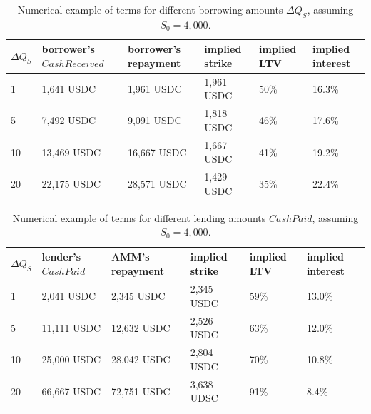 \documentclass[a4paper]{article}
\begin{document}
\begin{table}[]
\small
\begin{tabular}{p{0.5cm}p{2cm}p{2cm}p{2cm}p{2cm}p{1.5cm}}
\hline
\textbf{$\Delta Q_S$} & \textbf{borrower's $CashReceived$} & \textbf{borrower's repayment} & \textbf{implied strike} & \textbf{implied LTV} & \textbf{implied interest} \\ \hline
1                     & 1,641 USDC                  & 1,961 USDC                    & 1,961 USDC              & 50\%                 & 16.3\%                    \\ \hline
5                     & 7,492 USDC                   & 9,091 USDC                    & 1,818 USDC              & 46\%                 & 17.6\%                    \\ \hline
10                    & 13,469 USDC                  & 16,667 USDC                   & 1,667 USDC              & 41\%                 & 19.2\%                    \\ \hline
20                    & 22,175 USDC                  & 28,571 USDC                   & 1,429 USDC              & 35\%                 & 22.4\%                    \\ \hline
\end{tabular}
\label{tab:example_borrowers}
\caption{Numerical example of terms for different borrowing amounts $\Delta Q_S$, assuming $S_0=4,000$.}
\end{table}


\begin{table}[]
\small
\begin{tabular}{p{0.5cm}p{2cm}p{2cm}p{2cm}p{2cm}p{1.5cm}}
\hline
\textbf{$\Delta Q_S$} & \textbf{lender's $CashPaid$} & \textbf{AMM's repayment} & \textbf{implied strike} & \textbf{implied LTV} & \textbf{implied interest} \\ \hline
1                     & 2,041 USDC                   & 2,345 USDC             & 2,345 USDC                  & 59\%                 & 13.0\%                    \\ \hline
5                     & 11,111 USDC                  & 12,632 USDC            & 2,526 USDC              & 63\%                 & 12.0\%                    \\ \hline
10                    & 25,000 USDC                  & 28,042 USDC            & 2,804 USDC              & 70\%                 & 10.8\%                    \\ \hline
20                    & 66,667 USDC                  & 72,751 USDC            & 3,638 UDSC              & 91\%                 & 8.4\%                     \\ \hline
\end{tabular}
\caption{Numerical example of terms for different lending amounts $CashPaid$, assuming $S_0=4,000$.}
\label{tab:example_lenders}
\end{table}
\end{document}
